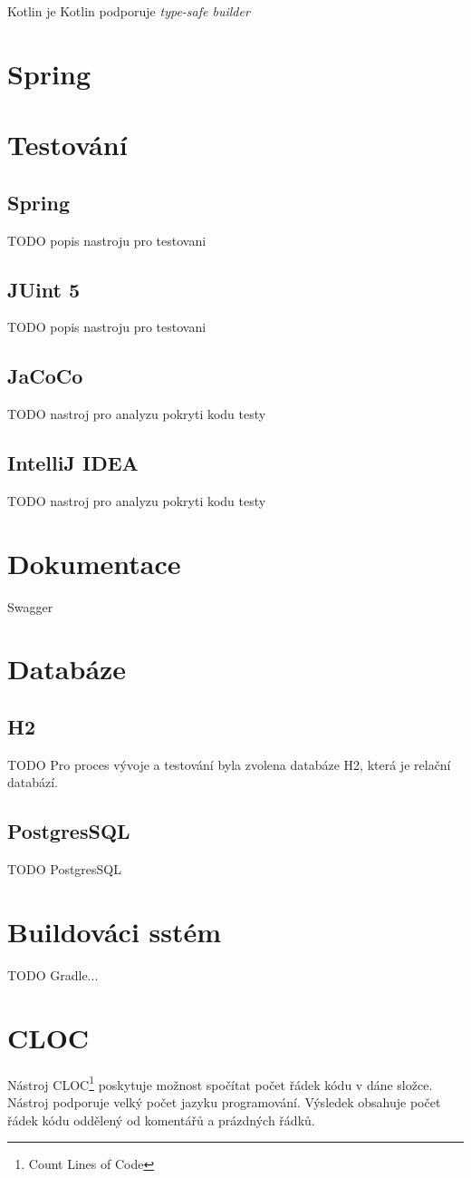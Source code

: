     
    Kotlin je Kotlin podporuje \textit{type-safe builder}
\section{Spring}\label{resere:j2ee}
    
\section{Testování}\label{resere:testovani}
    \subsection{Spring}
    TODO popis nastroju pro testovani
    \subsection{JUint 5}
    TODO popis nastroju pro testovani
    \subsection{JaCoCo}\label{resere:testovani:jacoco}
    TODO nastroj pro analyzu pokryti kodu testy \cite{JoCoCo}
    \subsection{IntelliJ IDEA}\label{resere:testovani:intellij-idea}
    TODO nastroj pro analyzu pokryti kodu testy \cite{intellij-idea-code-coverage}

\section{Dokumentace}\label{resere:dokumentace}
    Swagger
    
\section{Databáze}\label{resere:databaze}

    \subsection{H2}
        TODO Pro proces vývoje a testování byla zvolena databáze H2\cite{h2-db}, která je relační databází. 
    \subsection{PostgresSQL}
        TODO PostgresSQL
    
\section{Buildováci sstém}\label{resere:build}
    TODO Gradle...

\section{CLOC}\label{reserse:cloc}
    Nástroj CLOC\footnote{Count Lines of Code}\cite{cloc-download} poskytuje možnost spočítat počet řádek kódu v dáne složce. Nástroj podporuje velký počet jazyku programování. Výsledek obsahuje počet řádek kódu oddělený od komentářů a prázdných řádků.